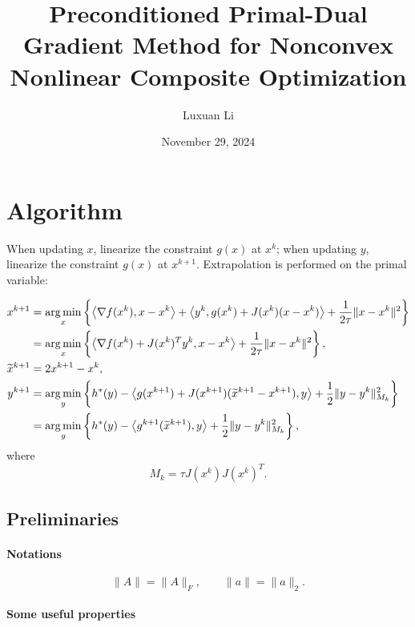 \documentclass[11pt]{article}
\title{Preconditioned Primal-Dual Gradient Method for Nonconvex Nonlinear Composite Optimization}
\author{Luxuan Li}
\date{November 29, 2024}
\numberwithin{equation}{section}
\newcommand{\argmin}{\mathop{\rm arg\,min}}
\begin{document}
\maketitle

\section{Algorithm}

When updating $x$, linearize the constraint $g(x)$ at $x^k$; when updating $y$, linearize the constraint $g(x)$ at $x^{k+1}$. Extrapolation is performed on the primal variable:

\begin{align*}
x^{k+1}
&=\argmin_x\left\{
\left\langle \nabla f(x^k),x-x^k\right\rangle
+\left\langle y^k,g(x^k)+J(x^k)(x-x^k)\right\rangle
+\frac{1}{2\tau}\|x-x^k\|^2
\right\}\\
&=\argmin_x\left\{
\left\langle \nabla f(x^k)+J(x^k)^T y^k,x-x^k\right\rangle
+\frac{1}{2\tau}\|x-x^k\|^2
\right\},\\
\widetilde{x}^{k+1}&=2x^{k+1}-x^k,\\
y^{k+1}
&=\argmin_y\left\{
h^*(y)-\left\langle g(x^{k+1})+J(x^{k+1})(\widetilde{x}^{k+1}-x^{k+1}),y\right\rangle
+\frac{1}{2}\|y-y^k\|_{M_k}^2
\right\}\\
&=\argmin_y\left\{
h^*(y)-\left\langle g^{k+1}(\widetilde{x}^{k+1}),y\right\rangle
+\frac{1}{2}\|y-y^k\|_{M_k}^2
\right\},
\end{align*}
where
\[
M_k=\tau J(x^k)J(x^k)^T.
\]

\subsection{Preliminaries}

\paragraph{Notations}
\[
\|A\|=\|A\|_F,\qquad \|a\|=\|a\|_2.
\]

\paragraph{Some useful properties}
\end{document}
